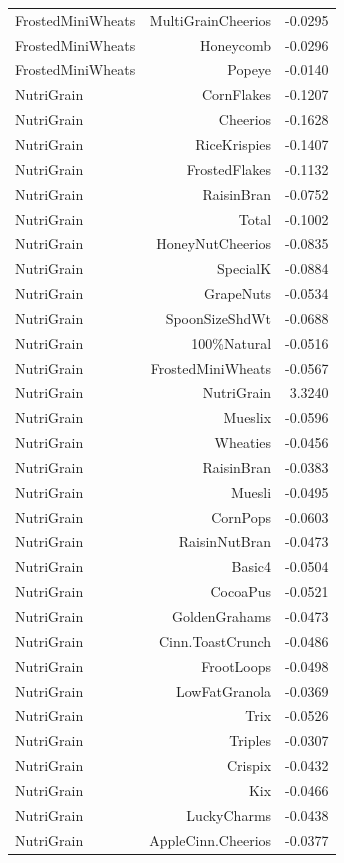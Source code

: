 \begin{longtable}{@{}lrr@{}}
FrostedMiniWheats & MultiGrainCheerios & -0.0295 \\
FrostedMiniWheats & Honeycomb & -0.0296 \\
FrostedMiniWheats & Popeye & -0.0140 \\
NutriGrain & CornFlakes & -0.1207 \\
NutriGrain & Cheerios & -0.1628 \\
NutriGrain & RiceKrispies & -0.1407 \\
NutriGrain & FrostedFlakes & -0.1132 \\
NutriGrain & RaisinBran & -0.0752 \\
NutriGrain & Total & -0.1002 \\
NutriGrain & HoneyNutCheerios & -0.0835 \\
NutriGrain & SpecialK & -0.0884 \\
NutriGrain & GrapeNuts & -0.0534 \\
NutriGrain & SpoonSizeShdWt & -0.0688 \\
NutriGrain & 100\%Natural & -0.0516 \\
NutriGrain & FrostedMiniWheats & -0.0567 \\
NutriGrain & NutriGrain & 3.3240 \\
NutriGrain & Mueslix & -0.0596 \\
NutriGrain & Wheaties & -0.0456 \\
NutriGrain & RaisinBran & -0.0383 \\
NutriGrain & Muesli & -0.0495 \\
NutriGrain & CornPops & -0.0603 \\
NutriGrain & RaisinNutBran & -0.0473 \\
NutriGrain & Basic4 & -0.0504 \\
NutriGrain & CocoaPus & -0.0521 \\
NutriGrain & GoldenGrahams & -0.0473 \\
NutriGrain & Cinn.ToastCrunch & -0.0486 \\
NutriGrain & FrootLoops & -0.0498 \\
NutriGrain & LowFatGranola & -0.0369 \\
NutriGrain & Trix & -0.0526 \\
NutriGrain & Triples & -0.0307 \\
NutriGrain & Crispix & -0.0432 \\
NutriGrain & Kix & -0.0466 \\
NutriGrain & LuckyCharms & -0.0438 \\
NutriGrain & AppleCinn.Cheerios & -0.0377 \\

\end{longtable}
